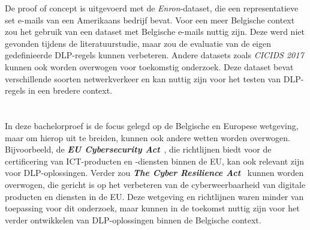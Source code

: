 De proof of concept is uitgevoerd met de \textit{Enron}-dataset, die een representatieve set e-mails van een Amerikaans bedrijf bevat.
Voor een meer Belgische context zou het gebruik van een dataset met Belgische e-mails nuttig zijn. 
Deze werd niet gevonden tijdens de literatuurstudie, maar zou de evaluatie van de eigen gedefinieerde DLP-regels kunnen verbeteren.
Andere datasets zoals \textit{CICIDS 2017} kunnen ook worden overwogen voor toekomstig onderzoek.
Deze dataset bevat verschillende soorten netwerkverkeer en kan nuttig zijn voor het testen van DLP-regels in een bredere context.

\section{}
\label{sec:alternatieve-wetgeving}

In deze bachelorproef is de focus gelegd op de Belgische en Europese wetgeving, maar om hierop uit te breiden, kunnen ook andere wetten worden overwogen.
Bijvoorbeeld, de \textbf{\textit{EU Cybersecurity Act}}~\autocite{EPREU2019}, die richtlijnen biedt voor de certificering van ICT-producten en -diensten binnen de EU, kan ook relevant zijn voor DLP-oplossingen.
Verder zou \textbf{\textit{The Cyber Resilience Act}}~\autocite{EPC2024} kunnen worden overwogen, die gericht is op het verbeteren van de cyberweerbaarheid van digitale producten en diensten in de EU.
Deze wetgeving en richtlijnen waren minder van toepassing voor dit onderzoek, maar kunnen in de toekomst nuttig zijn voor het verder ontwikkelen van DLP-oplossingen binnen de Belgische context.




